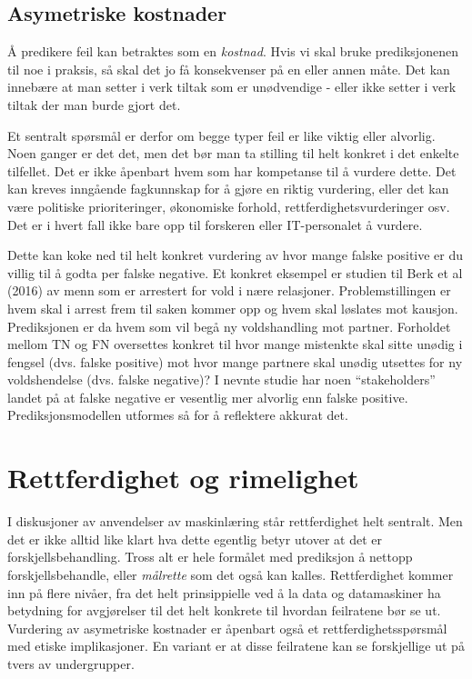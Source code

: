 \documentclass[
  letterpaper,
  DIV=11,
  numbers=noendperiod]{scrreprt}
\begin{document}
\subsection{Asymetriske kostnader}\label{asymetriske-kostnader}

Å predikere feil kan betraktes som en \emph{kostnad}. Hvis vi skal bruke
prediksjonenen til noe i praksis, så skal det jo få konsekvenser på en
eller annen måte. Det kan innebære at man setter i verk tiltak som er
unødvendige - eller ikke setter i verk tiltak der man burde gjort det.

Et sentralt spørsmål er derfor om begge typer feil er like viktig eller
alvorlig. Noen ganger er det det, men det bør man ta stilling til helt
konkret i det enkelte tilfellet. Det er ikke åpenbart hvem som har
kompetanse til å vurdere dette. Det kan kreves inngående fagkunnskap for
å gjøre en riktig vurdering, eller det kan være politiske
prioriteringer, økonomiske forhold, rettferdighetsvurderinger osv. Det
er i hvert fall ikke bare opp til forskeren eller IT-personalet å
vurdere.

Dette kan koke ned til helt konkret vurdering av hvor mange falske
positive er du villig til å godta per falske negative. Et konkret
eksempel er studien til Berk et al (2016) av menn som er arrestert for
vold i nære relasjoner. Problemstillingen er hvem skal i arrest frem til
saken kommer opp og hvem skal løslates mot kausjon. Prediksjonen er da
hvem som vil begå ny voldshandling mot partner. Forholdet mellom TN og
FN oversettes konkret til hvor mange mistenkte skal sitte unødig i
fengsel (dvs. falske positive) mot hvor mange partnere skal unødig
utsettes for ny voldshendelse (dvs. falske negative)? I nevnte studie
har noen ``stakeholders'' landet på at falske negative er vesentlig mer
alvorlig enn falske positive. Prediksjonsmodellen utformes så for å
reflektere akkurat det.

\section{Rettferdighet og rimelighet}\label{rettferdighet-og-rimelighet}

I diskusjoner av anvendelser av maskinlæring står rettferdighet helt
sentralt. Men det er ikke alltid like klart hva dette egentlig betyr
utover at det er forskjellsbehandling. Tross alt er hele formålet med
prediksjon å nettopp forskjellsbehandle, eller \emph{målrette} som det
også kan kalles. Rettferdighet kommer inn på flere nivåer, fra det helt
prinsippielle ved å la data og datamaskiner ha betydning for avgjørelser
til det helt konkrete til hvordan feilratene bør se ut. Vurdering av
asymetriske kostnader er åpenbart også et rettferdighetsspørsmål med
etiske implikasjoner. En variant er at disse feilratene kan se
forskjellige ut på tvers av undergrupper.
\end{document}
